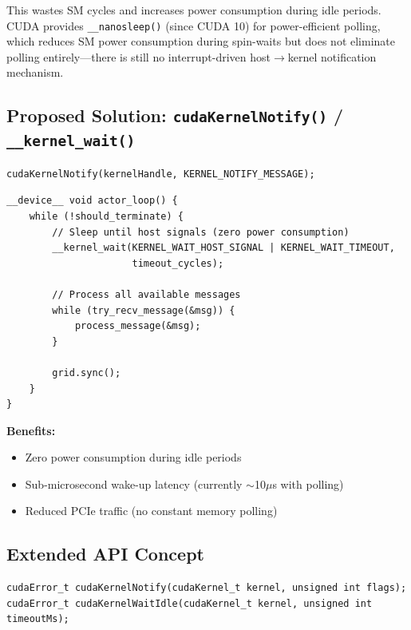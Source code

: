 \documentclass[11pt,a4paper]{article}
\newenvironment{benefitsbox}{%
    \vspace{6pt}%
    \noindent\textbf{Benefits:}%
    \begin{itemize}[leftmargin=1.5em,topsep=2pt,itemsep=1pt]%
}{%
    \end{itemize}%
    \vspace{6pt}%
}
\begin{document}
This wastes SM cycles and increases power consumption during idle periods. CUDA provides \texttt{\_\_nanosleep()} (since CUDA 10) for power-efficient polling, which reduces SM power consumption during spin-waits but does not eliminate polling entirely---there is still no interrupt-driven host$\to$kernel notification mechanism.

\subsection{Proposed Solution: \texttt{cudaKernelNotify()} / \texttt{\_\_kernel\_wait()}}

\begin{lstlisting}[style=cstyle,title={Host side - signal the kernel}]
cudaKernelNotify(kernelHandle, KERNEL_NOTIFY_MESSAGE);
\end{lstlisting}

\begin{lstlisting}[style=cstyle,title={Kernel side - efficient wait}]
__device__ void actor_loop() {
    while (!should_terminate) {
        // Sleep until host signals (zero power consumption)
        __kernel_wait(KERNEL_WAIT_HOST_SIGNAL | KERNEL_WAIT_TIMEOUT,
                      timeout_cycles);

        // Process all available messages
        while (try_recv_message(&msg)) {
            process_message(&msg);
        }

        grid.sync();
    }
}
\end{lstlisting}

\begin{benefitsbox}
    \item Zero power consumption during idle periods
    \item Sub-microsecond wake-up latency (currently $\sim$10$\mu$s with polling)
    \item Reduced PCIe traffic (no constant memory polling)
\end{benefitsbox}

\subsection{Extended API Concept}

\begin{lstlisting}[style=cstyle,title={Host API}]
cudaError_t cudaKernelNotify(cudaKernel_t kernel, unsigned int flags);
cudaError_t cudaKernelWaitIdle(cudaKernel_t kernel, unsigned int timeoutMs);
\end{lstlisting}
\end{document}
